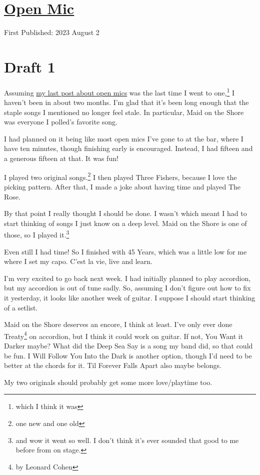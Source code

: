 \documentclass[12pt]{article}[titlepage]
\newcommand{\1}{\={a}}
\newcommand{\2}{\={e}}
\newcommand{\3}{\={\i}}
\newcommand{\4}{\=o}
\newcommand{\5}{\=u}
\newcommand{\6}{\={A}}
\renewcommand{\,}{\textsuperscript{,}}
\begin{document}
\doublespacing
\section{\href{open-mic-7.html}{Open Mic}}
First Published: 2023 August 2

\section{Draft 1}
Assuming \href{open-mic-6.html}{my last post about open mics} was the last time I went to one,\footnote{which I think it was} I haven't been in about two months.
I'm glad that it's been long enough that the staple songs I mentioned no longer feel stale.
In particular, Maid on the Shore was everyone I polled's favorite song.

I had planned on it being like most open mics I've gone to at the bar, where I have ten minutes, though finishing early is encouraged.
Instead, I had fifteen and a generous fifteen at that.
It was fun!

I played two original songs.\footnote{one new and one old}
I then played Three Fishers, because I love the picking pattern.
After that, I made a joke about having time and played The Rose.

By that point I really thought I should be done.
I wasn't which meant I had to start thinking of songs I just know on a deep level.
Maid on the Shore is one of those, so I played it.\footnote{and wow it went so well.
I don't think it's ever sounded that good to me before from on stage.}

Even still I had time!
So I finished with 45 Years, which was a little low for me where I set my capo.
C'est la vie, live and learn.

I'm very excited to go back next week.
I had initially planned to play accordion, but my accordion is out of tune sadly.
So, assuming I don't figure out how to fix it yesterday, it looks like another week of guitar.
I suppose I should start thinking of a setlist.

Maid on the Shore deserves an encore, I think at least.
I've only ever done Treaty\footnote{by Leonard Cohen} on accordion, but I think it could work on guitar.
If not, You Want it Darker maybe?
What did the Deep Sea Say is a song my band did, so that could be fun.
I Will Follow You Into the Dark is another option, though I'd need to be better at the chords for it.
Til Forever Falls Apart also maybe belongs.

My two originals should probably get some more love/playtime too.
\end{document}
